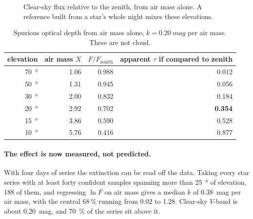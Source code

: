 \documentclass[11pt,a4paper]{article}
\begin{document}
\begin{figure}[h]
\centering
{}
\caption{Clear-sky flux relative to the zenith, from air mass alone. A
reference built from a star's whole night mixes these elevations.}
\label{fig:airmass}
\end{figure}

\begin{table}[h]
\centering
\small
\begin{tabular}{rrrr}
\toprule
elevation & air mass $X$ & $F/F_{\text{zenith}}$ & apparent $\tau$ if compared to zenith \\
\midrule
\SI{70}{\degree} & 1.06 & 0.988 & 0.012 \\
\SI{50}{\degree} & 1.31 & 0.945 & 0.056 \\
\SI{30}{\degree} & 2.00 & 0.832 & 0.184 \\
\SI{20}{\degree} & 2.92 & 0.702 & \textbf{0.354} \\
\SI{15}{\degree} & 3.86 & 0.590 & 0.528 \\
\SI{10}{\degree} & 5.76 & 0.416 & 0.877 \\
\bottomrule
\end{tabular}
\caption{Spurious optical depth from air mass alone, $k=\SI{0.20}{mag}$ per air
mass. These are not cloud.}
\label{tab:airmass}
\end{table}

\paragraph{The effect is now measured, not predicted.} With four days of series
the extinction can be read off the data. Taking every star series with at least
forty confident samples spanning more than \SI{25}{\degree} of elevation, 188 of
them, and regressing $\ln F$ on air mass gives a median $k$ of
\SI{0.38}{mag} per air mass, with the central 68\,\% running from
\num{0.02} to \num{1.28}. Clear-sky $V$-band is about \SI{0.20}{mag}, and
\SI{70}{\percent} of the series sit above it.
\end{document}

